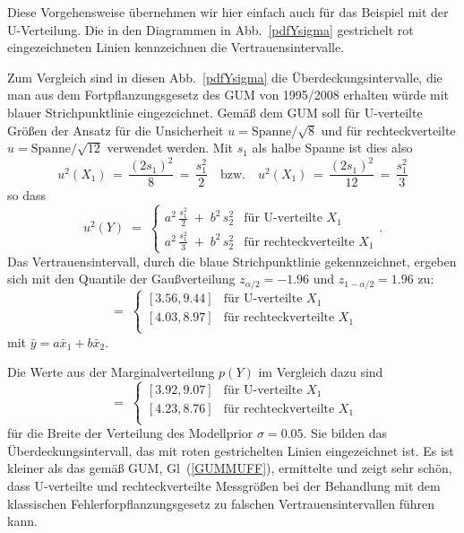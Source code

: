 Diese Vorgehensweise übernehmen wir hier einfach auch für das Beispiel mit der U-Verteilung. Die in den Diagrammen in Abb.~\ref{pdfYsigma} gestrichelt rot
eingezeichneten Linien kennzeichnen die Vertrauensintervalle.

Zum Vergleich sind in diesen Abb.~\ref{pdfYsigma} die Überdeckungsintervalle, die
man aus dem Fortpflanzungsgesetz des GUM von 1995/2008 erhalten würde mit blauer
Strichpunktlinie eingezeichnet. Gemäß dem GUM soll für U-verteilte
Größen der Ansatz für die Unsicherheit $u = \mathrm{Spanne}/\sqrt{8}$ und für
rechteckverteilte
$u = \mathrm{Spanne}/\sqrt{12}$ verwendet werden. Mit $s_1$ als halbe Spanne ist dies
also
\begin{equation}
u^2(X_1) \, = \, \frac{(2 s_1)^2}{8} \, = \, \frac{s_1^2}{2} \quad \text{bzw.}
\quad u^2(X_1) \, = \, \frac{(2 s_1)^2}{12} \, = \, \frac{s_1^2}{3}
\end{equation}
so dass
\begin{equation}
\renewcommand{\arraystretch}{1.3}
u^2(Y) \; = \; \left\{\begin{array}{ll}
a^2 \, \frac{s_1^2}{2} \; + \; b^2 \, s_2^2 & \text{für U-verteilte~} X_1\\
a^2 \, \frac{s_1^2}{3} \; + \; b^2 \, s_2^2 & \text{für rechteckverteilte~} X_1
\end{array}\right. .
\label{GUMMUFF}
\end{equation}
Das Vertrauensintervall, durch die blaue Strichpunktlinie gekennzeichnet, ergeben sich mit den Quantile der Gaußverteilung $z_{\alpha/2} = -1.96$ und $z_{1-\alpha/2} = 1.96$ zu:
\begin{equation}
[\bar y \; - \; 1.96 \, u(Y), \; \bar y \; + \; 1.96 \, u(Y)]
\; = \; \left\{\begin{array}{ll}
[3.56, 9.44] & \text{für U-verteilte~} X_1\\
\left[4.03, 8.97\right] & \text{für rechteckverteilte~} X_1\\
\end{array}\right.
\end{equation}
mit $\bar y = a \bar x_1 + b \bar x_2$.

Die Werte aus der Marginalverteilung $p(Y)$ im Vergleich dazu sind
\begin{equation}
[P^{-1}(\alpha/2), \; P^{-1}(1 - \alpha/2)]
\; = \; \left\{\begin{array}{ll}
[3.92, 9.07] & \text{für U-verteilte~} X_1\\
\left[4.23, 8.76\right] & \text{für rechteckverteilte~} X_1\\
\end{array}\right.
\end{equation}
für die Breite der Verteilung des Modellprior $\sigma = 0.05$. Sie bilden das
Überdeckungsintervall, das mit roten gestrichelten Linien eingezeichnet ist. Es ist kleiner als das gemäß GUM, Gl~(\ref{GUMMUFF}), ermittelte und zeigt sehr schön, dass
U-verteilte und rechteckverteilte Messgrößen bei der Behandlung mit dem klassischen
Fehlerforpflanzungsgesetz zu falschen Vertrauensintervallen führen kann.

